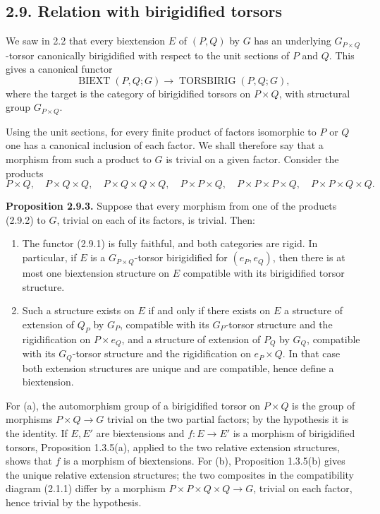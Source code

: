 \documentclass[11pt]{article}
\providecommand{\BIEXT}{\operatorname{BIEXT}}
\providecommand{\TORSBIRIG}{\operatorname{TORSBIRIG}}
\begin{document}
\subsection*{2.9. Relation with birigidified torsors}
We saw in 2.2 that every biextension \(E\) of \((P,Q)\) by \(G\) has an underlying \(G_{P\times Q}\)-torsor canonically birigidified with respect to the unit sections of \(P\) and \(Q\).  This gives a canonical functor
\begin{equation}\tag{2.9.1}
  \BIEXT(P,Q;G)\longrightarrow\TORSBIRIG(P,Q;G),
\end{equation}
where the target is the category of birigidified torsors on \(P\times Q\), with structural group \(G_{P\times Q}\).

Using the unit sections, for every finite product of factors isomorphic to \(P\) or \(Q\) one has a canonical inclusion of each factor.  We shall therefore say that a morphism from such a product to \(G\) is trivial on a given factor.  Consider the products
\begin{equation}\tag{2.9.2}
  P\times Q,
  \quad P\times Q\times Q,
  \quad P\times Q\times Q\times Q,
  \quad P\times P\times Q,
  \quad P\times P\times P\times Q,
  \quad P\times P\times Q\times Q.
\end{equation}

\textbf{Proposition 2.9.3.}  Suppose that every morphism from one of the products (2.9.2) to \(G\), trivial on each of its factors, is trivial.  Then:
\begin{enumerate}[label=\alph*)]
\item The functor (2.9.1) is fully faithful, and both categories are rigid.  In particular, if \(E\) is a \(G_{P\times Q}\)-torsor birigidified for \((e_P,e_Q)\), then there is at most one biextension structure on \(E\) compatible with its birigidified torsor structure.
\item Such a structure exists on \(E\) if and only if there exists on \(E\) a structure of extension of \(Q_P\) by \(G_P\), compatible with its \(G_P\)-torsor structure and the rigidification on \(P\times e_Q\), and a structure of extension of \(P_Q\) by \(G_Q\), compatible with its \(G_Q\)-torsor structure and the rigidification on \(e_P\times Q\).  In that case both extension structures are unique and are compatible, hence define a biextension.
\end{enumerate}

For (a), the automorphism group of a birigidified torsor on \(P\times Q\) is the group of morphisms \(P\times Q\to G\) trivial on the two partial factors; by the hypothesis it is the identity.  If \(E,E'\) are biextensions and \(f:E\to E'\) is a morphism of birigidified torsors, Proposition 1.3.5(a), applied to the two relative extension structures, shows that \(f\) is a morphism of biextensions.  For (b), Proposition 1.3.5(b) gives the unique relative extension structures; the two composites in the compatibility diagram (2.1.1) differ by a morphism \(P\times P\times Q\times Q\to G\), trivial on each factor, hence trivial by the hypothesis.
\end{document}
